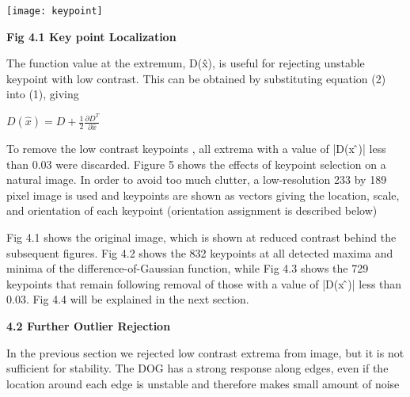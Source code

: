 \documentclass[12pt,a4paper]{report}
\begin{document}
\begin{flushleft}
\begin{center}\texttt{[image: keypoint]}\end{center}
\begin{center}\textbf{Fig 4.1 Key point Localization}\end{center}


\vspace{10mm}

The function value at the extremum, D(\^x), is useful for rejecting unstable keypoint with low contrast. This can be obtained by substituting equation (2) into (1), giving

\vspace{10mm}


\begin{center}$D(\hat x) = D + \frac{1}{2}\frac{\partial D^T}{\partial \hat x}$\end{center}

\vspace{10mm}


To remove the low contrast keypoints , all extrema with a value of |D(x ̂)| less than 0.03 were discarded.
Figure 5 shows the effects of keypoint selection on a natural image. In order to avoid too
much clutter, a low-resolution 233 by 189 pixel image is used and keypoints are shown as
vectors giving the location, scale, and orientation of each keypoint (orientation assignment is described below)\par

\vspace{10mm}

Fig 4.1 shows the original image, which is shown at reduced contrast behind the subsequent figures. Fig 4.2 shows the 832 keypoints at all detected maxima and minima of the difference-of-Gaussian function, while  Fig 4.3 shows the 729 keypoints that remain following removal of those with a value of |D(x ̂)| less than 0.03. Fig 4.4 will be explained in the next section.

\newpage



\textbf{4.2 Further  Outlier Rejection}
\vspace{10mm}

In the previous section we rejected low contrast extrema from image, but it is not sufficient for stability. The DOG has a strong response  along  edges, even if the location around each edge is unstable and therefore makes small amount of noise\par

\vspace{10mm}



\end{flushleft}
\end{document}
